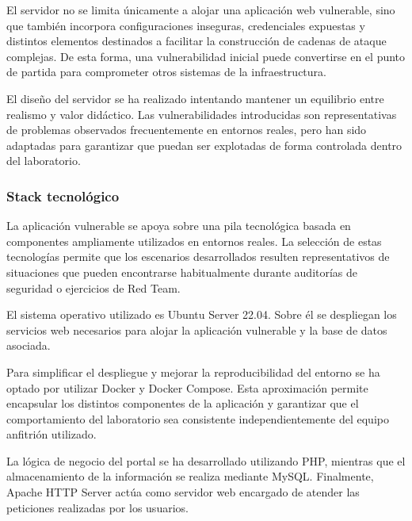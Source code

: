 El servidor no se limita únicamente a alojar una aplicación web vulnerable, sino que también incorpora configuraciones inseguras, credenciales expuestas y distintos elementos destinados a facilitar la construcción de cadenas de ataque complejas. De esta forma, una vulnerabilidad inicial puede convertirse en el punto de partida para comprometer otros sistemas de la infraestructura.

El diseño del servidor se ha realizado intentando mantener un equilibrio entre realismo y valor didáctico. Las vulnerabilidades introducidas son representativas de problemas observados frecuentemente en entornos reales, pero han sido adaptadas para garantizar que puedan ser explotadas de forma controlada dentro del laboratorio.


\subsubsection{Stack tecnológico}

La aplicación vulnerable se apoya sobre una pila tecnológica basada en componentes ampliamente utilizados en entornos reales. La selección de estas tecnologías permite que los escenarios desarrollados resulten representativos de situaciones que pueden encontrarse habitualmente durante auditorías de seguridad o ejercicios de Red Team.

El sistema operativo utilizado es Ubuntu Server 22.04. Sobre él se despliegan los servicios web necesarios para alojar la aplicación vulnerable y la base de datos asociada.

Para simplificar el despliegue y mejorar la reproducibilidad del entorno se ha optado por utilizar Docker y Docker Compose. Esta aproximación permite encapsular los distintos componentes de la aplicación y garantizar que el comportamiento del laboratorio sea consistente independientemente del equipo anfitrión utilizado.

La lógica de negocio del portal se ha desarrollado utilizando PHP, mientras que el almacenamiento de la información se realiza mediante MySQL. Finalmente, Apache HTTP Server actúa como servidor web encargado de atender las peticiones realizadas por los usuarios.

\vspace{0.5cm}
\renewcommand{\arraystretch}{1.5}

